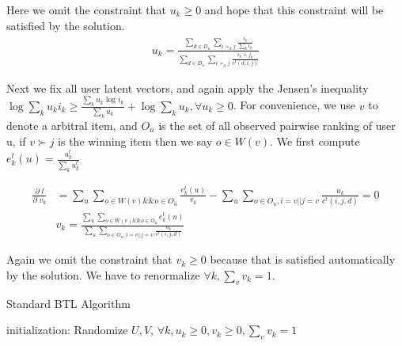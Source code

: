 \documentclass{article}
\begin{document}
Here we omit the constraint that $u_k \geq 0$ and hope that this constraint will be satisfied by the solution.
\begin{align}
u_k = \frac{\sum_{d\in D_u} \sum_{i \succ_d j} \frac{i_k}{\sum_k i_k} }{\sum_{d\in D_u} \sum_{i \succ_d j}\frac{i_k+j_k}{c^t(d,i,j)}}
\end{align}


Next we fix all user latent vectors, and again apply the Jensen’s inequality $\log \sum_k u_k i_k \geq \frac{\sum_k u_k \log i_k}{\sum_k u_k}+ \log \sum_k u_k,\forall u_k \geq 0$.  For convenience, we use $v$  to denote a arbitral item, and $O_u$  is the set of all observed pairwise ranking of user u, if $ v \succ j $ is the winning item then we say $o \in W(v)$.  We first compute $e_k^t(u) = \frac{u_k^t}{\sum_k u_k^t}$

\begin{align}
\frac{\partial \;l}{\partial \;v_k}
 &=\sum_{u} \sum_{o \in W(v) \&\& o \in O_u} \frac{e_k^t(u)}{v_k} - \sum_{u} \sum_{o \in O_u,i=v||j=v} \frac{u_k}{c^t(i, j, d)} =0\\
 & v_k =\frac{\sum_{u} \sum_{o \in W(v) \&\& o \in O_u} e_k^t(u)}{\sum_{u} \sum_{o \in O_u,i=v||j=v} \frac{u_k}{c^t(i, j, d)}}
\end{align}

Again we omit the constraint that $v_k \geq 0$ because that is satisfied automatically by the solution. We have to renormalize $\forall k, \sum_v v_k =1 $.

\begin{algorithm}[H]
    \caption{Standard BTL Algorithm}

    initialization: Randomize $U,V$, $\forall k, u_k\geq 0, v_k \geq 0, \sum_v v_k=1$ \;
\end{algorithm}
\end{document}

